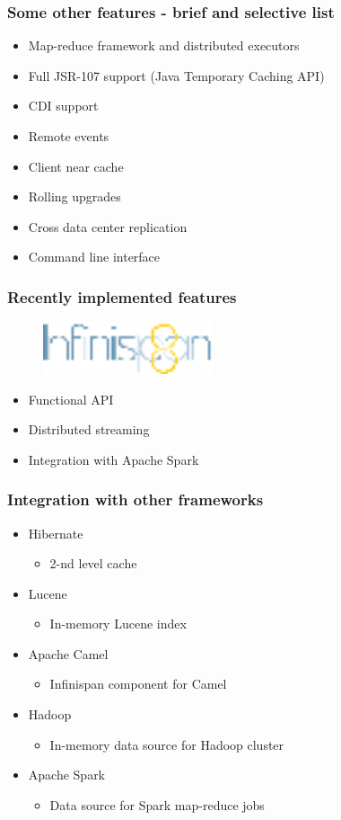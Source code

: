 \documentclass[10pt,utf8]{beamer}
\begin{document}
\begin{frame}
  \frametitle{Some other features - brief and selective list}
  \begin{itemize}
		\item Map-reduce framework and distributed executors
		\item Full JSR-107 support (Java Temporary Caching API)
		\item CDI support
		\item Remote events
		\item Client near cache
		\item Rolling upgrades
		\item Cross data center replication
		\item Command line interface
  \end{itemize}
\end{frame}


\begin{frame}
  \frametitle{Recently implemented features}
	\begin{figure}
		\centering
		\includegraphics[width=5cm]{./img/infinispan8.eps}
	\end{figure}
  \begin{itemize}
    \item Functional API
		\item Distributed streaming
		\item Integration with Apache Spark
  \end{itemize}
\end{frame}

\begin{frame}
  \frametitle{Integration with other frameworks}
  \begin{itemize}
    \item Hibernate
		\begin{itemize}
			\item 2-nd level cache
		\end{itemize}
		\item Lucene
		\begin{itemize}
		 \item In-memory Lucene index 
		\end{itemize}
		\item Apache Camel
		\begin{itemize}
		 \item Infinispan component for Camel
		\end{itemize}
		\item Hadoop
		\begin{itemize}
			\item In-memory data source for Hadoop cluster
		\end{itemize}
		\item Apache Spark
		\begin{itemize}
			\item Data source for Spark map-reduce jobs
		\end{itemize}
  \end{itemize}
\end{frame}
\end{document}
